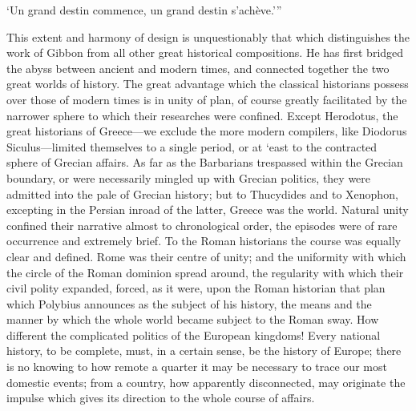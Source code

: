 ‘Un grand destin commence, un grand destin s’achève.’”

This extent and harmony of design is unquestionably that which distinguishes the work of Gibbon from all other great historical compositions. He has first bridged the abyss between ancient and modern times, and connected together the two great worlds of history. The great advantage which the classical historians possess over those of modern times is in unity of plan, of course greatly facilitated by the narrower sphere to which their researches were confined. Except Herodotus, the great historians of Greece—we exclude the more modern compilers, like Diodorus Siculus—limited themselves to a single period, or at ‘east to the contracted sphere of Grecian affairs. As far as the Barbarians trespassed within the Grecian boundary, or were necessarily mingled up with Grecian politics, they were admitted into the pale of Grecian history; but to Thucydides and to Xenophon, excepting in the Persian inroad of the latter, Greece was the world. Natural unity confined their narrative almost to chronological order, the episodes were of rare occurrence and extremely brief. To the Roman historians the course was equally clear and defined. Rome was their centre of unity; and the uniformity with which the circle of the Roman dominion spread around, the regularity with which their civil polity expanded, forced, as it were, upon the Roman historian that plan which Polybius announces as the subject of his history, the means and the manner by which the whole world became subject to the Roman sway. How different the complicated politics of the European kingdoms! Every national history, to be complete, must, in a certain sense, be the history of Europe; there is no knowing to how remote a quarter it may be necessary to trace our most domestic events; from a country, how apparently disconnected, may originate the impulse which gives its direction to the whole course of affairs.


